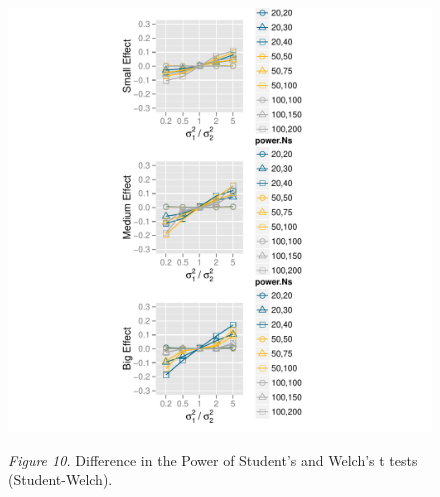 \documentclass[man,a4paper,noextraspace,apacite]{apa6}\usepackage[]{graphicx}\usepackage[]{color}
\makeatletter
\def\maxwidth{ %
  \ifdim\Gin@nat@width>\linewidth
    \linewidth
  \else
    \Gin@nat@width
  \fi
}
\newenvironment{knitrout}{}{} %
\makeatother
\begin{document}
\begin{figure}
\begin{knitrout}
\color{fgcolor}
\includegraphics[width=\maxwidth]{figure/plotPowerDiff} 

\end{knitrout}
\textit{Figure 10.} Difference in the Power of Student's and Welch's t tests (Student-Welch).
\end{figure}
\end{document}
